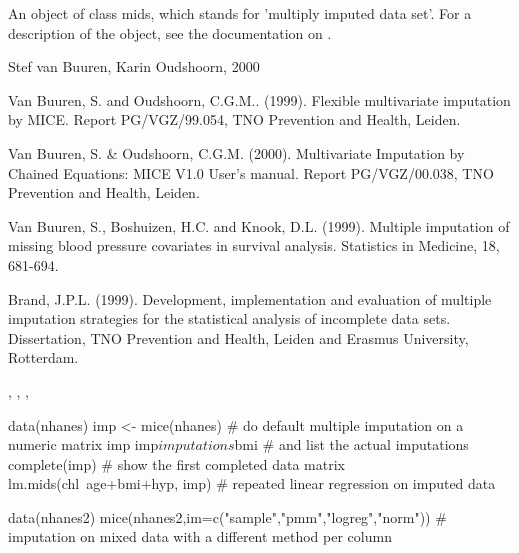 \begin{Value}
An object of class mids, which stands for 'multiply imputed data set'. For 
a description of the object, see the documentation on .
\end{Value}
\begin{Author}\relax
Stef van Buuren, Karin Oudshoorn, 2000
\end{Author}
\begin{References}\relax
Van Buuren, S. and Oudshoorn, C.G.M.. (1999). Flexible multivariate
imputation by MICE. Report PG/VGZ/99.054, TNO Prevention and Health,
Leiden. 

Van Buuren, S. \& Oudshoorn, C.G.M. (2000). Multivariate Imputation by
Chained Equations:  
MICE V1.0 User's manual. Report PG/VGZ/00.038, TNO Prevention and
Health, Leiden. 

Van Buuren, S., Boshuizen, H.C. and Knook, D.L. (1999). Multiple
imputation of missing blood pressure covariates in survival
analysis. Statistics in Medicine, 18, 681-694. 

Brand, J.P.L. (1999). Development, implementation and evaluation of multiple imputation strategies for the statistical analysis of incomplete data sets. Dissertation, TNO Prevention and Health, Leiden and Erasmus University, Rotterdam.
\end{References}
\begin{SeeAlso}\relax
{}, , , 
\end{SeeAlso}
\begin{Examples}
\begin{ExampleCode}
data(nhanes)
imp <- mice(nhanes)     # do default multiple imputation on a numeric matrix
imp
imp$imputations$bmi     # and list the actual imputations 
complete(imp)       # show the first completed data matrix
lm.mids(chl~age+bmi+hyp, imp)   # repeated linear regression on imputed data

data(nhanes2)
mice(nhanes2,im=c("sample","pmm","logreg","norm")) # imputation on mixed data with a different method per column
\end{ExampleCode}
\end{Examples}

